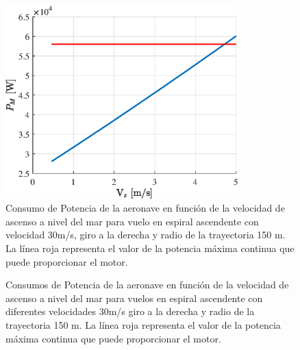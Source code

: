 \begin{figure}
	\centering
	\includegraphics[width=90mm]{graficos/PMVEVz}
	\caption{Consumo de Potencia de la aeronave en función de la velocidad de ascenso a nivel del mar para vuelo en espiral ascendente con velocidad 30m/s, giro a la derecha y radio de la trayectoria 150 m. La línea roja representa el valor de la potencia máxima continua que puede proporcionar el motor.}
	\label{PMVEVz}
\end{figure}
\begin{figure}
	\centering
	\caption{Consumos de Potencia de la aeronave en función de la velocidad de ascenso a nivel del mar para vuelos en espiral ascendente con diferentes velocidades 30m/s giro a la derecha y radio de la trayectoria 150 m. La línea roja representa el valor de la potencia máxima continua que puede proporcionar el motor.}
	\label{PMVEVz2}
\end{figure}
